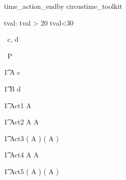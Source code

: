 \begin{zsection}
   \SECTION time\_action\_endby \parents circustime\_toolkit
\end{zsection}


\begin{axdef}
   tval: \nat
\where
   tval > 20 \land tval<30
\end{axdef}


\begin{circus}
   \circchannel\ c, d \\
\end{circus}

\begin{circus}
    \circprocess\ P \circdef \circbegin \\
\end{circus}


\begin{circusaction}
    	\t1 A \circdef c \then \Skip \\
\end{circusaction}

\begin{circusaction}
        \t1 B \circdef d \then \Skip \\
\end{circusaction}
     
\begin{circusaction}
        \t1 Act1 \circdef  A \circendby {} \rcirctime  \\
\end{circusaction}

\begin{circusaction}
        \t1 Act2 \circdef  A \circendby {} \rcirctime \circseq A \circendby {} \rcirctime \\
\end{circusaction}

\begin{circusaction}
        \t1 Act3 \circdef ( A \circendby {} \rcirctime )  \circseq ( A \circendby {} \rcirctime )\\
\end{circusaction}

\begin{circusaction}
        \t1 Act4 \circdef  A \circendby {} \rcirctime \extchoice A \circendby {} \rcirctime \\
\end{circusaction}

\begin{circusaction}
        \t1 Act5 \circdef ( A \circendby {} \rcirctime )  \extchoice ( A \circendby {} \rcirctime  )\\
\end{circusaction}

